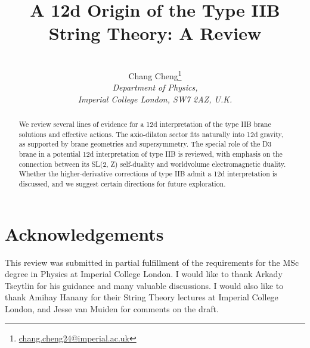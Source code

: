 \documentclass[11pt]{article}
\title{A 12d Origin of the Type IIB String Theory: A Review}
\author{
\\[2pt]
\large{Chang Cheng}\footnote{\href{mailto:chang.cheng24@imperial.ac.uk}{chang.cheng24@imperial.ac.uk}} 
\\[10pt]
\it{Department of Physics,}\\
\it{Imperial College London, SW7 2AZ, U.K.}
\\[2pt]
}
\date{}
\begin{document}
\maketitle



\begin{abstract}
We review several lines of evidence for a 12d interpretation of the type IIB brane solutions and effective actions.
The axio-dilaton sector fits naturally into 12d gravity, as supported by brane geometries and supersymmetry.
The special role of the D3 brane in a potential 12d interpretation of type IIB is reviewed, with emphasis on the connection between its SL(2, Z) self-duality and worldvolume electromagnetic duality.
Whether the higher-derivative corrections of type IIB admit a 12d interpretation is discussed, and we suggest certain directions for future exploration.
\end{abstract}
\tableofcontents










\section{Acknowledgements}
This review was submitted in partial fulfillment of the requirements for the MSc degree in Physics at Imperial College London.
I would like to thank Arkady Tseytlin for his guidance and many valuable discussions.
{\color{orange}I would also like to thank Amihay Hanany for their String Theory lectures at Imperial College London, and Jesse van Muiden for comments on the draft. }

\newpage
\appendix









\end{document}

